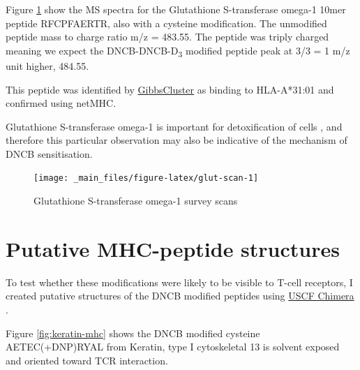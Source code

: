 \documentclass[12pt,]{book}
\begin{document}
Figure \ref{fig:glut-scan} show the MS spectra for the Glutathione
S-transferase omega-1 10mer peptide RFCPFAERTR, also with a cysteine
modification. The unmodified peptide mass to charge ratio m/z = 483.55.
The peptide was triply charged meaning we expect the
DNCB-DNCB-D\textsubscript{3} modified peptide peak at 3/3 = 1 m/z unit
higher, 484.55.

This peptide was identified by
\protect\hyperlink{clustering-of-peptides}{GibbsCluster} as binding to
HLA-A*31:01 and confirmed using netMHC.

Glutathione S-transferase omega-1 is important for detoxification of
cells \citep[\citet{jacquoilleot2015}]{spriggs2016}, and therefore this
particular observation may also be indicative of the mechanism of DNCB
sensitisation.

\begin{figure}

{\centering \texttt{[image: \_main\_files/figure-latex/glut-scan-1]} 

}

\caption{Glutathione S-transferase omega-1 survey scans}\label{fig:glut-scan}
\end{figure}

\section{Putative MHC-peptide
structures}\label{putative-mhc-peptide-structures}

To test whether these modifications were likely to be visible to T-cell
receptors, I created putative structures of the DNCB modified peptides
using \href{https://www.cgl.ucsf.edu/chimera/}{USCF Chimera}
\citep{pettersen2004}.

Figure \ref{fig:keratin-mhc} shows the DNCB modified cysteine
AETEC(+DNP)RYAL from Keratin, type I cytoskeletal 13 is solvent exposed
and oriented toward TCR interaction.
\end{document}
